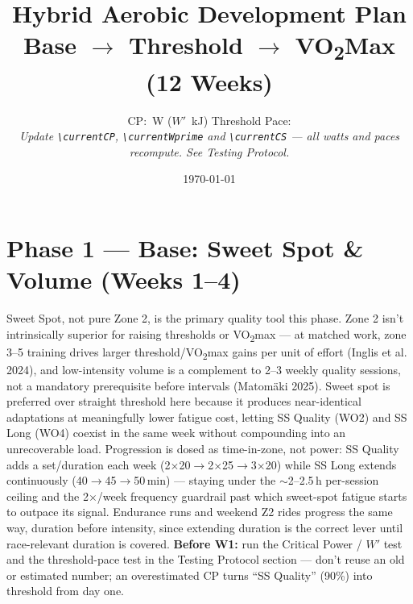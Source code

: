 \documentclass[a4paper,10pt]{article}
\title{\textbf{\Huge Hybrid Aerobic Development Plan}\\[0.3em]
       \large Base $\to$ Threshold $\to$ VO\textsubscript{2}Max \quad (12 Weeks)}
\author{CP: \currentCP{}\,W ($W'$ \currentWprime{}\,kJ) \quad\textbullet\quad Threshold Pace: \rpace{100} \\[0.2em]
        \textit{\small Update \texttt{\textbackslash currentCP}, \texttt{\textbackslash currentWprime} and
                       \texttt{\textbackslash currentCS} --- all watts and paces recompute. See Testing Protocol.}}
\date{\today}
\newcommand{\NoteBox}[1]{%
  \noindent\colorbox{accent!6}{\begin{minipage}{\dimexpr\textwidth-2\fboxsep\relax}
  \footnotesize #1
  \end{minipage}}%
}
\begin{document}
\maketitle


\section*{\color{ssaccent!70!black}Phase 1 --- Base: Sweet Spot \& Volume (Weeks 1--4)}

\NoteBox{Sweet Spot, not pure Zone 2, is the primary quality tool this phase. Zone 2 isn't
intrinsically superior for raising thresholds or VO\textsubscript{2}max --- at matched work, zone
3--5 training drives larger threshold/VO\textsubscript{2}max gains per unit of effort (Inglis et al.
2024), and low-intensity volume is a complement to 2--3 weekly quality sessions, not a mandatory
prerequisite before intervals (Matomäki 2025). Sweet spot is preferred over straight threshold here
because it produces near-identical adaptations at meaningfully lower fatigue cost, letting SS Quality
(WO2) and SS Long (WO4) coexist in the same week without compounding into an unrecoverable load.
Progression is dosed as time-in-zone, not power: SS Quality adds a set/duration each week
(2$\times$20$\to$2$\times$25$\to$3$\times$20) while SS Long extends continuously
(40$\to$45$\to$50\,min) --- staying under the $\sim$2--2.5\,h per-session ceiling and the 2$\times$/week
frequency guardrail past which sweet-spot fatigue starts to outpace its signal. Endurance runs and
weekend Z2 rides progress the same way, duration before intensity, since extending duration is the
correct lever until race-relevant duration is covered. \textbf{Before W1:} run the Critical Power /
$W'$ test and the threshold-pace test in the Testing Protocol section --- don't reuse an old or
estimated number; an overestimated CP turns ``SS Quality'' (90\%) into threshold from day one.}

\medskip
\end{document}

